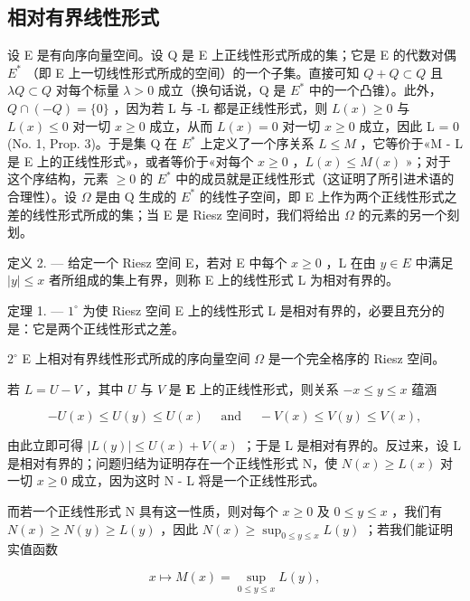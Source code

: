 \subsection{相对有界线性形式}

设 E 是有向序向量空间。设 Q 是 E 上正线性形式所成的集；它是 E 的代数对偶 \(E^{*}\) （即 E 上一切线性形式所成的空间）的一个子集。直接可知 \(Q + Q \subset Q\) 且 \(\lambda Q \subset Q\) 对每个标量 \(\lambda > 0\) 成立（换句话说，Q 是 \(E^{*}\) 中的一个凸锥）。此外，\(Q \cap (-Q) = \{0\}\) ，因为若 L 与 -L 都是正线性形式，则 \(L(x) \geqslant 0\) 与 \(L(x) \leqslant 0\) 对一切 \(x \geqslant 0\) 成立，从而 \(L(x) = 0\) 对一切 \(x \geqslant 0\) 成立，因此 L = 0 (No. 1, Prop. 3)。于是集 Q 在 \(E^{*}\) 上定义了一个序关系 \(L \leqslant M\) ，它等价于«M - L 是 E 上的正线性形式»，或者等价于«对每个 \(x \geqslant 0\) ，\(L(x) \leqslant M(x)\) »；对于这个序结构，元素 \(\geqslant 0\) 的 \(E^{*}\) 中的成员就是正线性形式（这证明了所引进术语的合理性）。设 \(\Omega\) 是由 Q 生成的 \(E^{*}\) 的线性子空间，即 E 上作为两个正线性形式之差的线性形式所成的集；当 E 是 Riesz 空间时，我们将给出 \(\Omega\) 的元素的另一个刻划。

定义 2. --- 给定一个 Riesz 空间 E，若对 E 中每个 \(x \geqslant 0\) ，L 在由 \(y \in E\) 中满足 \(|y| \leqslant x\) 者所组成的集上有界，则称 E 上的线性形式 L 为相对有界的。

定理 1. --- \(1^{\circ}\) 为使 Riesz 空间 E 上的线性形式 L 是相对有界的，必要且充分的是：它是两个正线性形式之差。

\(2^{\circ}\) E 上相对有界线性形式所成的序向量空间 \(\Omega\) 是一个完全格序的 Riesz 空间。

若 \(L = U - V\) ，其中 \(U\) 与 \(V\) 是 \(\mathbf{E}\) 上的正线性形式，则关系 \(-x \leqslant y \leqslant x\) 蕴涵

\[
- U (x) \leqslant U (y) \leqslant U (x) \quad \text { and } \quad - V (x) \leqslant V (y) \leqslant V (x),
\]

由此立即可得 \(|L(y)| \leqslant U(x) + V(x)\) ；于是 L 是相对有界的。反过来，设 L 是相对有界的；问题归结为证明存在一个正线性形式 N，使 \(N(x) \geqslant L(x)\) 对一切 \(x \geqslant 0\) 成立，因为这时 N - L 将是一个正线性形式。

而若一个正线性形式 N 具有这一性质，则对每个 \(x \geqslant 0\) 及 \(0 \leqslant y \leqslant x\) ，我们有 \(N(x) \geqslant N(y) \geqslant L(y)\) ，因此 \(N(x) \geqslant \sup_{0 \leqslant y \leqslant x} L(y)\) ；若我们能证明实值函数

\[
x \mapsto M (x) = \sup _ {0 \leqslant y \leqslant x} L (y),
\]


